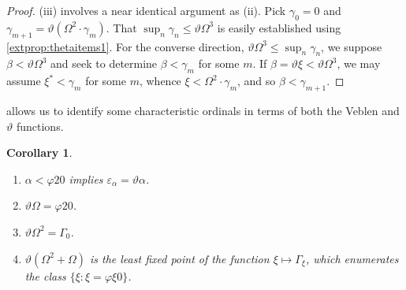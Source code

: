 \documentclass[UKenglish,cleveref,DIV=12]{scrartcl}
\newtheorem{corollary}[lemma]{Corollary}
\theoremstyle{definition}
\theoremstyle{definition}
\begin{document}
\begin{proof}
(iii) involves a near identical argument as (ii). Pick $\gamma_0=0$ and
$\gamma_{m+1}=\vartheta(\Omega^2\cdot\gamma_m)$. That
$\sup_{n}\gamma_n\le\vartheta\Omega^3$ is easily established using
\cref{extprop:thetaitems1}. For the converse direction,
$\vartheta\Omega^3\le\sup_{n}\gamma_n$, we suppose $\beta<\vartheta\Omega^3$ and
seek to determine $\beta<\gamma_m$ for some $m$. If
$\beta=\vartheta\xi<\vartheta\Omega^3$, we may assume $\xi^*<\gamma_m$ for
some $m$, whence $\xi<\Omega^2\cdot\gamma_m$, and so $\beta<\gamma_{m+1}$.
%
%
%
\end{proof}
 allows us to identify some characteristic ordinals in terms of both the Veblen and $\vartheta$ functions.
\begin{corollary}\label{extprop:thetaitems3}\
 \begin{enumerate}
  \item $\alpha<\varphi20$ implies $\varepsilon_\alpha=\vartheta\alpha$.
  \item $\vartheta\Omega=\varphi20$.
  \item $\vartheta\Omega^2=\Gamma_0$.
  \item $\vartheta(\Omega^2+\Omega)$ is the least fixed point of the function
	$\xi\mapsto\Gamma_\xi$, which enumerates the class $\{\xi:\xi=\varphi\xi0\}$.
 \end{enumerate}
\end{corollary}
\end{document}
